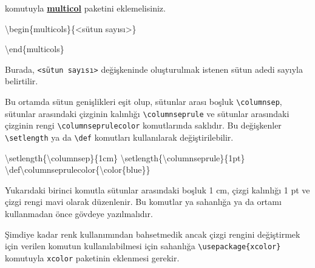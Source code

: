 \documentclass[
  letterpaper,
  DIV=11,
  numbers=noendperiod]{scrreprt}
\newenvironment{Shaded}{\begin{snugshade}}{\end{snugshade}}
\newcommand{\ExtensionTok}[1]{\textcolor[rgb]{0.00,0.23,0.31}{#1}}
\newcommand{\FunctionTok}[1]{\textcolor[rgb]{0.28,0.35,0.67}{#1}}
\newcommand{\KeywordTok}[1]{\textcolor[rgb]{0.00,0.23,0.31}{#1}}
\newcommand{\NormalTok}[1]{\textcolor[rgb]{0.00,0.23,0.31}{#1}}
\begin{document}
komutuyla
\href{http://ftp.ntua.gr/mirror/ctan/macros/latex/required/tools/multicol.pdf}{\textbf{multicol}}
paketini eklemelisiniz.

\begin{Shaded}
\begin{Highlighting}[]
\KeywordTok{\textbackslash{}begin}\NormalTok{\{}\ExtensionTok{multicols}\NormalTok{\}\{\textless{}sütun sayısı\textgreater{}\}}

\KeywordTok{\textbackslash{}end}\NormalTok{\{}\ExtensionTok{multicols}\NormalTok{\}}
\end{Highlighting}
\end{Shaded}

Burada, \texttt{\textless{}sütun\ sayısı\textgreater{}} değişkeninde
oluşturulmak istenen sütun adedi sayıyla belirtilir.

Bu ortamda sütun genişlikleri eşit olup, sütunlar arası boşluk
\texttt{\textbackslash{}columnsep}, sütunlar arasındaki çizginin
kalınlığı \texttt{\textbackslash{}columnseprule} ve sütunlar arasındaki
çizginin rengi \texttt{\textbackslash{}columnseprulecolor} komutlarında
saklıdır. Bu değişkenler \texttt{\textbackslash{}setlength} ya da
\texttt{\textbackslash{}def} komutları kullanılarak değiştirilebilir.

\begin{Shaded}
\begin{Highlighting}[]
\FunctionTok{\textbackslash{}setlength}\NormalTok{\{}\FunctionTok{\textbackslash{}columnsep}\NormalTok{\}\{1cm\}}
\FunctionTok{\textbackslash{}setlength}\NormalTok{\{}\FunctionTok{\textbackslash{}columnseprule}\NormalTok{\}\{1pt\}}
\FunctionTok{\textbackslash{}def\textbackslash{}columnseprulecolor}\NormalTok{\{}\FunctionTok{\textbackslash{}color}\NormalTok{\{blue\}\}}
\end{Highlighting}
\end{Shaded}

Yukarıdaki birinci komutla sütunlar arasındaki boşluk 1 cm, çizgi
kalınlığı 1 pt ve çizgi rengi mavi olarak düzenlenir. Bu komutlar ya
sahanlığa ya da ortamı kullanmadan önce gövdeye yazılmalıdır.

\begin{tcolorbox}[enhanced jigsaw, opacitybacktitle=0.6, coltitle=black, leftrule=.75mm, rightrule=.15mm, toprule=.15mm, bottomtitle=1mm, titlerule=0mm, colbacktitle=quarto-callout-note-color!10!white, breakable, arc=.35mm, opacityback=0, colframe=quarto-callout-note-color-frame, toptitle=1mm, title=\textcolor{quarto-callout-note-color}{\faInfo}\hspace{0.5em}{Not}, bottomrule=.15mm, left=2mm, colback=white]
Şimdiye kadar renk kullanımından bahsetmedik ancak çizgi rengini
değiştirmek için verilen komutun kullanılabilmesi için sahanlığa
\texttt{\textbackslash{}usepackage\{xcolor\}} komutuyla \texttt{xcolor}
paketinin eklenmesi gerekir.
\end{tcolorbox}
\end{document}
